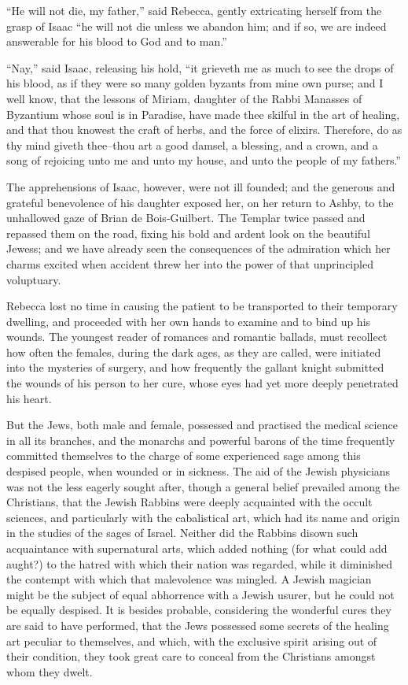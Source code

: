 ``He will not die, my father,'' said Rebecca, gently extricating herself
from the grasp of Isaac ``he will not die unless we abandon him; and if
so, we are indeed answerable for his blood to God and to man.''

``Nay,'' said Isaac, releasing his hold, ``it grieveth me as much to see
the drops of his blood, as if they were so many golden byzants from mine
own purse; and I well know, that the lessons of Miriam, daughter of the
Rabbi Manasses of Byzantium whose soul is in Paradise, have made thee
skilful in the art of healing, and that thou knowest the craft of herbs,
and the force of elixirs. Therefore, do as thy mind giveth thee--thou
art a good damsel, a blessing, and a crown, and a song of rejoicing unto
me and unto my house, and unto the people of my fathers.''

The apprehensions of Isaac, however, were not ill founded; and the
generous and grateful benevolence of his daughter exposed her, on her
return to Ashby, to the unhallowed gaze of Brian de Bois-Guilbert. The
Templar twice passed and repassed them on the road, fixing his bold and
ardent look on the beautiful Jewess; and we have already seen the
consequences of the admiration which her charms excited when accident
threw her into the power of that unprincipled voluptuary.

Rebecca lost no time in causing the patient to be transported to their
temporary dwelling, and proceeded with her own hands to examine and to
bind up his wounds. The youngest reader of romances and romantic
ballads, must recollect how often the females, during the dark ages, as
they are called, were initiated into the mysteries of surgery, and how
frequently the gallant knight submitted the wounds of his person to her
cure, whose eyes had yet more deeply penetrated his heart.

But the Jews, both male and female, possessed and practised the medical
science in all its branches, and the monarchs and powerful barons of the
time frequently committed themselves to the charge of some experienced
sage among this despised people, when wounded or in sickness. The aid of
the Jewish physicians was not the less eagerly sought after, though a
general belief prevailed among the Christians, that the Jewish Rabbins
were deeply acquainted with the occult sciences, and particularly with
the cabalistical art, which had its name and origin in the studies of
the sages of Israel. Neither did the Rabbins disown such acquaintance
with supernatural arts, which added nothing (for what could add aught?)
to the hatred with which their nation was regarded, while it diminished
the contempt with which that malevolence was mingled. A Jewish magician
might be the subject of equal abhorrence with a Jewish usurer, but he
could not be equally despised. It is besides probable, considering the
wonderful cures they are said to have performed, that the Jews possessed
some secrets of the healing art peculiar to themselves, and which, with
the exclusive spirit arising out of their condition, they took great
care to conceal from the Christians amongst whom they dwelt.

